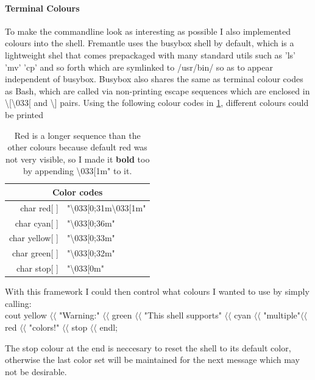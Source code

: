\documentclass[11pt]{article} %
\begin{document}
\paragraph{Terminal Colours\\}{
To make the commandline look as interesting as possible I also implemented colours into the shell. Fremantle uses the busybox shell by default, which is a lightweight shel that comes prepackaged with many standard utils such as 'ls' 'mv' 'cp' and so forth which are symlinked to /usr/bin/ so as to appear independent of busybox.
Busybox also shares the same as terminal colour codes as Bash, which are called via non-printing escape sequences which are enclosed in \textbackslash[\textbackslash033[ and \textbackslash] pairs.
Using the following colour codes in \cref{tab:colorcodes}, different colours could be printed

\begin{table}[H]
\centering
\begin{tabular}{| r | l |}
\hline
\multicolumn{2}{|c|}{\bf Color codes} \\
\hline
char red[ ] &"\textbackslash033[0;31m\textbackslash033[1m"\\
char cyan[ ] &"\textbackslash033[0;36m"\\
char yellow[ ] &"\textbackslash033[0;33m"\\
char green[ ] &"\textbackslash033[0;32m"\\
char stop[ ] &"\textbackslash033[0m"\\
\hline
\end{tabular}
\caption{Red is a longer sequence than the other colours because default red was not very visible, so I made it {\bf bold} too by appending \textbackslash033[1m" to it.}
\label{tab:colorcodes}
\end{table}

With this framework I could then control what colours I wanted to use by simply calling:\\
cout  yellow \(\langle\langle\) "Warning:" \(\langle\langle\) green \(\langle\langle\) "This shell supports" \(\langle\langle\) cyan \(\langle\langle\) "multiple"\(\langle\langle\)  red \(\langle\langle\) "colors!" \(\langle\langle\) stop \(\langle\langle\) endl;

The stop colour at the end is neccesary to reset the shell to its default color, otherwise the last color set will be maintained for the next message which may not be desirable.

}
\end{document}
